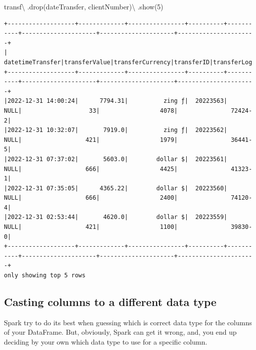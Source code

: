 \documentclass[
  11pt,
  letterpaper,
  DIV=11,
  numbers=noendperiod]{scrreprt}
\newenvironment{Shaded}{\begin{snugshade}}{\end{snugshade}}
\newcommand{\DecValTok}[1]{\textcolor[rgb]{0.68,0.00,0.00}{#1}}
\newcommand{\NormalTok}[1]{\textcolor[rgb]{0.00,0.23,0.31}{#1}}
\newcommand{\OperatorTok}[1]{\textcolor[rgb]{0.37,0.37,0.37}{#1}}
\newcommand{\StringTok}[1]{\textcolor[rgb]{0.13,0.47,0.30}{#1}}
\begin{document}
\begin{Shaded}
\begin{Highlighting}[]
\NormalTok{transf}\OperatorTok{\textbackslash{}}
\NormalTok{  .drop(}\StringTok{\textquotesingle{}dateTransfer\textquotesingle{}}\NormalTok{, }\StringTok{\textquotesingle{}clientNumber\textquotesingle{}}\NormalTok{)}\OperatorTok{\textbackslash{}}
\NormalTok{  .show(}\DecValTok{5}\NormalTok{)}
\end{Highlighting}
\end{Shaded}

\begin{verbatim}
+-------------------+-------------+----------------+----------+-----------+---------------------+---------------------+----------------------+
|   datetimeTransfer|transferValue|transferCurrency|transferID|transferLog|destinationBankNumber|destinationBankBranch|destinationBankAccount|
+-------------------+-------------+----------------+----------+-----------+---------------------+---------------------+----------------------+
|2022-12-31 14:00:24|      7794.31|          zing ƒ|  20223563|       NULL|                   33|                 4078|               72424-2|
|2022-12-31 10:32:07|       7919.0|          zing ƒ|  20223562|       NULL|                  421|                 1979|               36441-5|
|2022-12-31 07:37:02|       5603.0|        dollar $|  20223561|       NULL|                  666|                 4425|               41323-1|
|2022-12-31 07:35:05|      4365.22|        dollar $|  20223560|       NULL|                  666|                 2400|               74120-4|
|2022-12-31 02:53:44|       4620.0|        dollar $|  20223559|       NULL|                  421|                 1100|               39830-0|
+-------------------+-------------+----------------+----------+-----------+---------------------+---------------------+----------------------+
only showing top 5 rows
\end{verbatim}

\hypertarget{sec-cast-column-type}{%
\subsection{Casting columns to a different data
type}\label{sec-cast-column-type}}

Spark try to do its best when guessing which is correct data type for
the columns of your DataFrame. But, obviously, Spark can get it wrong,
and, you end up deciding by your own which data type to use for a
specific column.
\end{document}

